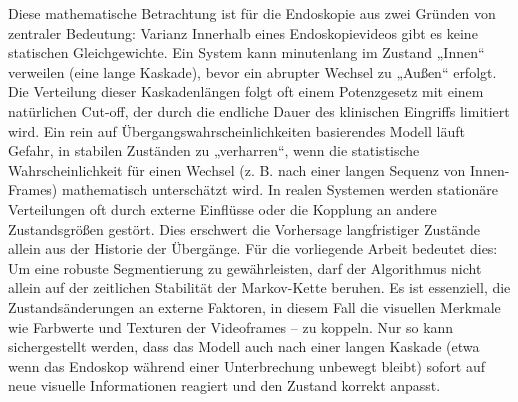 Diese mathematische Betrachtung ist für die Endoskopie aus zwei Gründen von zentraler Bedeutung: Varianz Innerhalb eines Endoskopievideos gibt es keine statischen Gleichgewichte. Ein System kann minutenlang im Zustand „Innen“ verweilen (eine lange Kaskade), bevor ein abrupter Wechsel zu „Außen“ erfolgt. Die Verteilung dieser Kaskadenlängen folgt oft einem Potenzgesetz mit einem natürlichen Cut-off, der durch die endliche Dauer des klinischen Eingriffs limitiert wird. Ein rein auf Übergangswahrscheinlichkeiten basierendes Modell läuft Gefahr, in stabilen Zuständen zu „verharren“, wenn die statistische Wahrscheinlichkeit für einen Wechsel (z. B. nach einer langen Sequenz von Innen-Frames) mathematisch unterschätzt wird. In realen Systemen werden stationäre Verteilungen oft durch externe Einflüsse oder die Kopplung an andere Zustandsgrößen gestört. Dies erschwert die Vorhersage langfristiger Zustände allein aus der Historie der Übergänge. Für die vorliegende Arbeit bedeutet dies: Um eine robuste Segmentierung zu gewährleisten, darf der Algorithmus nicht allein auf der zeitlichen Stabilität der Markov-Kette beruhen. Es ist essenziell, die Zustandsänderungen an externe Faktoren, in diesem Fall die visuellen Merkmale wie Farbwerte und Texturen der Videoframes – zu koppeln. Nur so kann sichergestellt werden, dass das Modell auch nach einer langen Kaskade (etwa wenn das Endoskop während einer Unterbrechung unbewegt bleibt) sofort auf neue visuelle Informationen reagiert und den Zustand korrekt anpasst.

